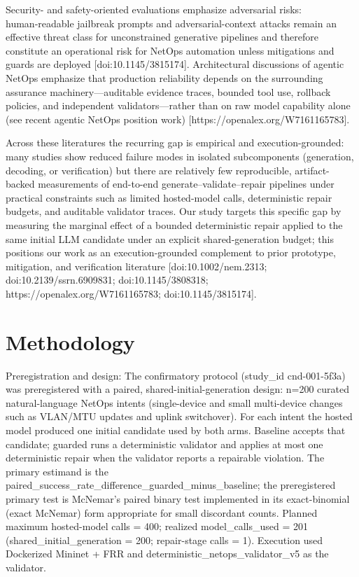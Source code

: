 \documentclass[conference]{IEEEtran}
\begin{document}
Security- and safety-oriented evaluations emphasize adversarial risks: human‑readable jailbreak prompts and adversarial-context attacks remain an effective threat class for unconstrained generative pipelines and therefore constitute an operational risk for NetOps automation unless mitigations and guards are deployed [doi:10.1145/3815174]. Architectural discussions of agentic NetOps emphasize that production reliability depends on the surrounding assurance machinery---auditable evidence traces, bounded tool use, rollback policies, and independent validators---rather than on raw model capability alone (see recent agentic NetOps position work) [https://openalex.org/W7161165783].

Across these literatures the recurring gap is empirical and execution-grounded: many studies show reduced failure modes in isolated subcomponents (generation, decoding, or verification) but there are relatively few reproducible, artifact-backed measurements of end-to-end generate--validate--repair pipelines under practical constraints such as limited hosted-model calls, deterministic repair budgets, and auditable validator traces. Our study targets this specific gap by measuring the marginal effect of a bounded deterministic repair applied to the same initial LLM candidate under an explicit shared-generation budget; this positions our work as an execution-grounded complement to prior prototype, mitigation, and verification literature [doi:10.1002/nem.2313; doi:10.2139/ssrn.6909831; doi:10.1145/3808318; https://openalex.org/W7161165783; doi:10.1145/3815174].

\section{Methodology}
Preregistration and design: The confirmatory protocol (study\_id cnd-001-5f3a) was preregistered with a paired, shared-initial-generation design: n=200 curated natural-language NetOps intents (single-device and small multi-device changes such as VLAN/MTU updates and uplink switchover). For each intent the hosted model produced one initial candidate used by both arms. Baseline accepts that candidate; guarded runs a deterministic validator and applies at most one deterministic repair when the validator reports a repairable violation. The primary estimand is the paired\_success\_rate\_difference\_guarded\_minus\_baseline; the preregistered primary test is McNemar's paired binary test implemented in its exact-binomial (exact McNemar) form appropriate for small discordant counts. Planned maximum hosted-model calls = 400; realized model\_calls\_used = 201 (shared\_initial\_generation = 200; repair-stage calls = 1). Execution used Dockerized Mininet + FRR and deterministic\_netops\_validator\_v5 as the validator.
\end{document}
